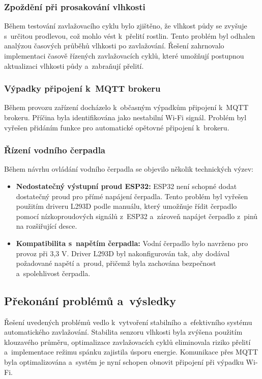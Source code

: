 \documentclass[a4paper, 11pt]{article}
\begin{document}
\subsubsection{Zpoždění při prosakování vlhkosti}
Během testování zavlažovacího cyklu bylo zjištěno, že vlhkost půdy se zvyšuje s~určitou prodlevou, což mohlo vést k~přelití rostlin. 
Tento problém byl odhalen analýzou časových průběhů vlhkosti po zavlažování. Řešení zahrnovalo implementaci časově řízených zavlažovacích cyklů, 
které umožňují postupnou aktualizaci vlhkosti půdy a~zabraňují přelití.

\subsubsection{Výpadky připojení k~MQTT brokeru}
Během provozu zařízení docházelo k~občasným výpadkům připojení k~MQTT brokeru. Příčina byla identifikována jako nestabilní Wi-Fi signál. 
Problém byl vyřešen přidáním funkce pro automatické opětovné připojení k~brokeru.

\subsubsection{Řízení vodního čerpadla}
Během návrhu ovládání vodního čerpadla se objevilo několik technických výzev:

\begin{itemize}
    \item \textbf{Nedostatečný výstupní proud ESP32:} ESP32 není schopné dodat dostatečný proud pro přímé napájení čerpadla. Tento problém byl vyřešen použitím driveru L293D podle manuálu\cite{sunfounder_pump_esp32}, který umožňuje řídit čerpadlo pomocí nízkoproudových signálů z~ESP32 a~zároveň napájet čerpadlo z~pinů na rozšiřující desce.
    \item \textbf{Kompatibilita s~napětím čerpadla:} Vodní čerpadlo bylo navrženo pro provoz při 3,3 V. Driver L293D byl nakonfigurován tak, aby dodával požadované napětí a~proud, přičemž byla zachována bezpečnost a~spolehlivost čerpadla.
\end{itemize}

\subsection{Překonání problémů a~výsledky}

Řešení uvedených problémů vedlo k~vytvoření stabilního a~efektivního systému automatického zavlažování. 
Stabilita senzoru vlhkosti byla zvýšena použitím klouzavého průměru, optimalizace zavlažovacích cyklů eliminovala riziko přelití
a~implementace režimu spánku zajistila úsporu energie. Komunikace přes MQTT byla optimalizována a~systém je nyní schopen obnovit připojení při výpadku Wi-Fi.
\end{document}
